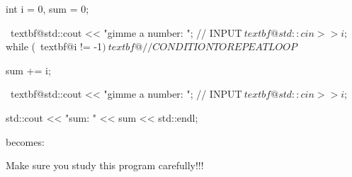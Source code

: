 \begin{console}[commandchars=\~\@\$]
int i = 0, sum = 0;

~textbf@std::cout << "gimme a number: "; // INPUT$
~textbf@std::cin >> i;$
while (~textbf@i != -1$) ~textbf@// CONDITION TO REPEAT LOOP$
{     
      sum += i;
      
      ~textbf@std::cout << "gimme a number: "; // INPUT$
      ~textbf@std::cin >> i;$
}
std::cout << "sum: " << sum << std::endl;
\end{console}
becomes:
Make sure you study this program carefully!!!

